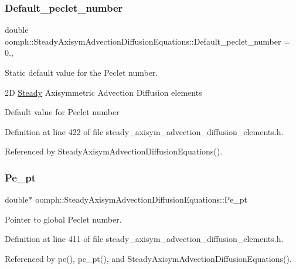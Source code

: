\subsubsection{\texorpdfstring{Default\+\_\+peclet\+\_\+number}{Default\_peclet\_number}}
{\footnotesize\ttfamily double oomph\+::\+Steady\+Axisym\+Advection\+Diffusion\+Equations\+::\+Default\+\_\+peclet\+\_\+number = 0.\hspace{0.3cm}{\ttfamily [static]}, {\ttfamily [private]}}



Static default value for the Peclet number. 

2D \hyperlink{classoomph_1_1Steady}{Steady} Axisymmetric Advection Diffusion elements

Default value for Peclet number 

Definition at line 422 of file steady\+\_\+axisym\+\_\+advection\+\_\+diffusion\+\_\+elements.\+h.



Referenced by Steady\+Axisym\+Advection\+Diffusion\+Equations().

\mbox{\label{classoomph_1_1SteadyAxisymAdvectionDiffusionEquations_a8183cdef608c998b509e9f1e5e6d51e4}} 
\subsubsection{\texorpdfstring{Pe\+\_\+pt}{Pe\_pt}}
{\footnotesize\ttfamily double$\ast$ oomph\+::\+Steady\+Axisym\+Advection\+Diffusion\+Equations\+::\+Pe\+\_\+pt\hspace{0.3cm}{\ttfamily [protected]}}



Pointer to global Peclet number. 



Definition at line 411 of file steady\+\_\+axisym\+\_\+advection\+\_\+diffusion\+\_\+elements.\+h.



Referenced by pe(), pe\+\_\+pt(), and Steady\+Axisym\+Advection\+Diffusion\+Equations().

\mbox{\label{classoomph_1_1SteadyAxisymAdvectionDiffusionEquations_a13e505efbd49d7c9e5df2b4977d31956}} 
